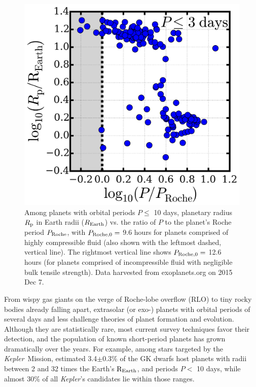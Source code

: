 \documentclass{svjour3}                     %
\newcommand{\kepler}{\emph{Kepler}}
\begin{document}
\begin{figure}
\includegraphics[width=\textwidth]{P-PRoche}
\caption{Among planets with orbital periods $P \le $ 10 days, planetary radius $R_{\rm p}$ in Earth radii ($R_{\rm Earth}$) vs. the ratio of $P$ to the planet's Roche period $P_{\rm Roche}$, with $P_{\rm Roche, 0} =$ 9.6 hours for planets comprised of highly compressible fluid (also shown with the leftmost dashed, vertical line). The rightmost vertical line shows $P_{\rm Roche, 0} =$ 12.6 hours (for planets comprised of incompressible fluid with negligible bulk tensile strength). Data harvested from exoplanets.org on 2015 Dec 7.}
\label{fig:P-PRoche}
\end{figure}

From wispy gas giants on the verge of Roche-lobe overflow (RLO) to tiny rocky bodies already falling apart, extrasolar (or exo-) planets with orbital periods of several days and less challenge theories of planet formation and evolution. Although they are statistically rare, most current survey techniques favor their detection, and the population of known short-period planets has grown dramatically over the years. For example, among stars targeted by the \kepler\ Mission, \cite{Howard2010Occurrence} estimated 3.4$\pm$0.3\% of the GK dwarfs host planets with radii between 2 and 32 times the Earth's ${\rm R_{Earth}}$, and periods $P <$ 10 days, while almost 30\% of all \kepler's candidates lie within those ranges. 
\end{document}

